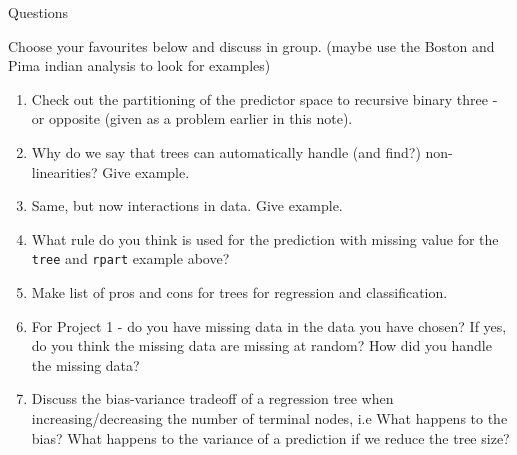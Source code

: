 \documentclass[
  ignorenonframetext,
]{beamer}
\providecommand{\tightlist}{%
  \setlength{\itemsep}{0pt}\setlength{\parskip}{0pt}}
\begin{document}
\begin{frame}[fragile]

\begin{block}{Questions}

Choose your favourites below and discuss in group. (maybe use the Boston
and Pima indian analysis to look for examples)

\begin{enumerate}
[1)]
\tightlist
\item
  Check out the partitioning of the predictor space to recursive binary
  three - or opposite (given as a problem earlier in this note).
\item
  Why do we say that trees can automatically handle (and find?)
  non-linearities? Give example.
\item
  Same, but now interactions in data. Give example.
\item
  What rule do you think is used for the prediction with missing value
  for the \texttt{tree} and \texttt{rpart} example above?
\item
  Make list of pros and cons for trees for regression and
  classification.
\item
  For Project 1 - do you have missing data in the data you have chosen?
  If yes, do you think the missing data are missing at random? How did
  you handle the missing data?
\item
  Discuss the bias-variance tradeoff of a regression tree when
  increasing/decreasing the number of terminal nodes, i.e What happens
  to the bias? What happens to the variance of a prediction if we reduce
  the tree size?
\end{enumerate}

\end{block}

\end{frame}
\end{document}
